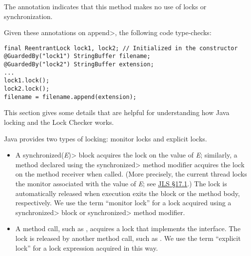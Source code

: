 The  annotation indicates that
this method makes no use of
locks or synchronization.

Given these annotations on \<append>, the following code type-checks:

\begin{verbatim}
final ReentrantLock lock1, lock2; // Initialized in the constructor
@GuardedBy("lock1") StringBuffer filename;
@GuardedBy("lock2") StringBuffer extension;
...
lock1.lock();
lock2.lock();
filename = filename.append(extension);
\end{verbatim}





This section gives some details that are helpful for understanding how Java
locking and the Lock Checker works.


Java provides two types of locking:  monitor locks and explicit locks.

\begin{itemize}
\item
  A \<synchronized(\emph{E})> block acquires the lock on the value of
  \emph{E}; similarly, a method declared using the \<synchronized> method
  modifier acquires the lock on the method receiver when called.
  (More precisely,
  the current thread locks the monitor associated with the value of
  \emph{E}; see \href{https://docs.oracle.com/javase/specs/jls/se10/html/jls-17.html#jls-17.1}{JLS \S17.1}.)
  The lock is automatically released when execution exits the block or the
  method body, respectively.
  We use the term ``monitor lock'' for a lock acquired using a
  \<synchronized>  block or \<synchronized> method modifier.
\item A method call, such as
  ,
  acquires a lock that implements the
  interface.
  The lock is released by another method call, such as
  .
  We use the term ``explicit lock'' for a lock expression acquired in this
  way.
\end{itemize}

